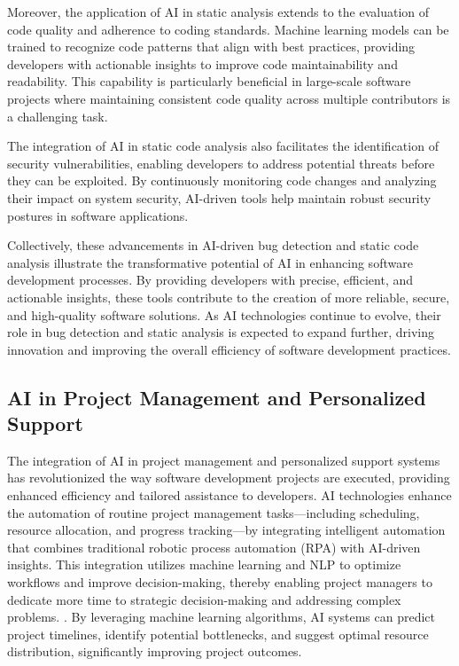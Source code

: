Moreover, the application of AI in static analysis extends to the evaluation of code quality and adherence to coding standards. Machine learning models can be trained to recognize code patterns that align with best practices, providing developers with actionable insights to improve code maintainability and readability. This capability is particularly beneficial in large-scale software projects where maintaining consistent code quality across multiple contributors is a challenging task.

The integration of AI in static code analysis also facilitates the identification of security vulnerabilities, enabling developers to address potential threats before they can be exploited. By continuously monitoring code changes and analyzing their impact on system security, AI-driven tools help maintain robust security postures in software applications.

Collectively, these advancements in AI-driven bug detection and static code analysis illustrate the transformative potential of AI in enhancing software development processes. By providing developers with precise, efficient, and actionable insights, these tools contribute to the creation of more reliable, secure, and high-quality software solutions. As AI technologies continue to evolve, their role in bug detection and static analysis is expected to expand further, driving innovation and improving the overall efficiency of software development practices.


\subsection{AI in Project Management and Personalized Support} \label{subsec:AI in Project Management and Personalized Support}

The integration of AI in project management and personalized support systems has revolutionized the way software development projects are executed, providing enhanced efficiency and tailored assistance to developers. AI technologies enhance the automation of routine project management tasks—including scheduling, resource allocation, and progress tracking—by integrating intelligent automation that combines traditional robotic process automation (RPA) with AI-driven insights. This integration utilizes machine learning and NLP to optimize workflows and improve decision-making, thereby enabling project managers to dedicate more time to strategic decision-making and addressing complex problems. \cite{pandy2024advancementsroboticsprocessautomation}. By leveraging machine learning algorithms, AI systems can predict project timelines, identify potential bottlenecks, and suggest optimal resource distribution, significantly improving project outcomes.



